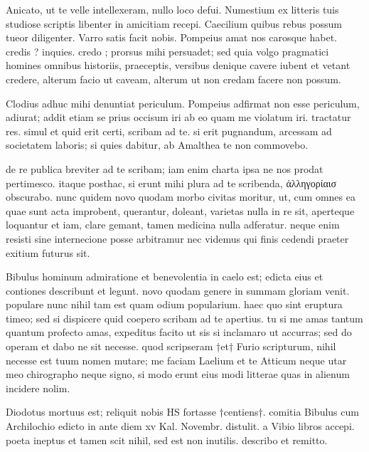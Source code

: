


 Anicato, ut te velle intellexeram, nullo loco defui. Numestium ex litteris tuis studiose scriptis libenter in amicitiam recepi. Caecilium quibus rebus possum tueor diligenter. Varro satis facit nobis. Pompeius amat nos carosque habet. credis ? inquies. credo ; prorsus mihi persuadet; sed quia volgo pragmatici homines omnibus historiis, praeceptis, versibus denique cavere iubent et vetant credere, alterum facio ut caveam, alterum ut non credam facere non possum.

 Clodius adhuc mihi denuntiat periculum. Pompeius adfirmat non esse periculum, adiurat; addit etiam se prius occisum iri ab eo quam me violatum iri. tractatur res. simul et quid erit certi, scribam ad te. si erit pugnandum, arcessam ad societatem laboris; si quies dabitur, ab Amalthea te non commovebo.

 de re publica breviter ad te scribam; iam enim charta ipsa ne nos prodat pertimesco. itaque posthac, si erunt mihi plura ad te scribenda, ἀλληγορίαισ obscurabo. nunc quidem novo quodam morbo civitas moritur, ut, cum omnes ea quae sunt acta improbent, querantur, doleant, varietas nulla in re sit, aperteque loquantur et iam, clare gemant, tamen medicina nulla adferatur. neque enim resisti sine internecione posse arbitramur nec videmus qui finis cedendi praeter exitium futurus sit.

 Bibulus hominum admiratione et benevolentia in caelo est; edicta eius et contiones describunt et legunt. novo quodam genere in summam gloriam venit. populare nunc nihil tam est quam odium popularium. haec quo sint eruptura timeo; sed si dispicere quid coepero scribam ad te apertius. tu si me amas tantum quantum profecto amas, expeditus facito ut sis si inclamaro ut accurras; sed do operam et dabo ne sit necesse. quod scripseram †et† Furio scripturum, nihil necesse est tuum nomen mutare; me faciam Laelium et te Atticum neque utar meo chirographo neque signo, si modo erunt eius modi litterae quas in alienum incidere nolim.

 Diodotus mortuus est; reliquit nobis HS fortasse †centiens†. comitia Bibulus cum Archilochio edicto in ante diem xv Kal. Novembr. distulit. a Vibio libros accepi. poeta ineptus et tamen scit nihil, sed est non inutilis. describo et remitto.
